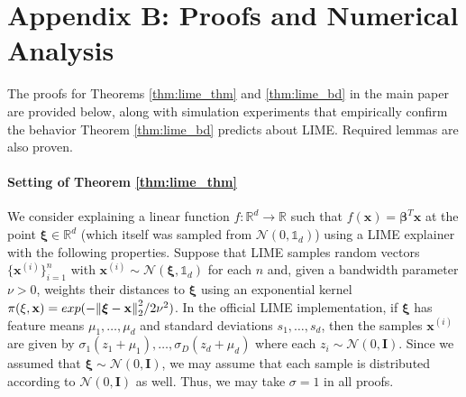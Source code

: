 \documentclass[mnsc,blindrev]{informs3}
\begin{document}
    \section*{Appendix B: Proofs and Numerical Analysis}  
        \label{apx_sec:proofs}    
        The proofs for Theorems \ref{thm:lime_thm} and \ref{thm:lime_bd} in the main paper are provided below, along with simulation experiments that empirically confirm the behavior Theorem \ref{thm:lime_bd} predicts about LIME. Required lemmas are also proven.
        
        \paragraph{Setting of Theorem \ref{thm:lime_thm}}
            We consider explaining a linear function $f:\mathbb{R}^d \rightarrow \mathbb{R}$ such that $f(\mathbf{x}) = \boldsymbol{\beta}^T \mathbf{x}$ at the point $\boldsymbol{\xi}\in \mathbb{R}^d$ (which itself was sampled from $\mathcal{N}(0, \mathds{1}_d)$) using a LIME explainer with the following properties. Suppose that LIME samples random vectors $\{\mathbf{x}^{(i)}\}_{i=1}^n$ with $\mathbf{x}^{(i)} \sim \mathcal{N}(\boldsymbol{\xi},\mathds{1}_d)$ for each $n$ and, given a bandwidth parameter $\nu > 0$, weights their distances to $\boldsymbol{\xi}$ using an exponential kernel $\pi(\xi,\mathbf{x}) = exp(-\norm{\boldsymbol{\xi} - \mathbf{x}}_2^2/2\nu^2)$. In the official LIME implementation, if $\boldsymbol{\xi}$ has feature means $\mu_1,\ldots,\mu_d$ and standard deviations $s_1,\ldots,s_d$, then the samples $\mathbf{x}^{(i)}$ are given by $\sigma_1(z_1 + \mu_1),\ldots,\sigma_D(z_d + \mu_d)$ where each $z_i\sim \mathcal{N}(0,\mathbf{I})$. Since we assumed that $\boldsymbol{\xi} \sim \mathcal{N}(0,\mathbf{I})$, we may assume that each sample is distributed according to $\mathcal{N}(0,\mathbf{I})$ as well. Thus, we may take $\sigma = 1$ in all proofs. 
        
\end{document}
